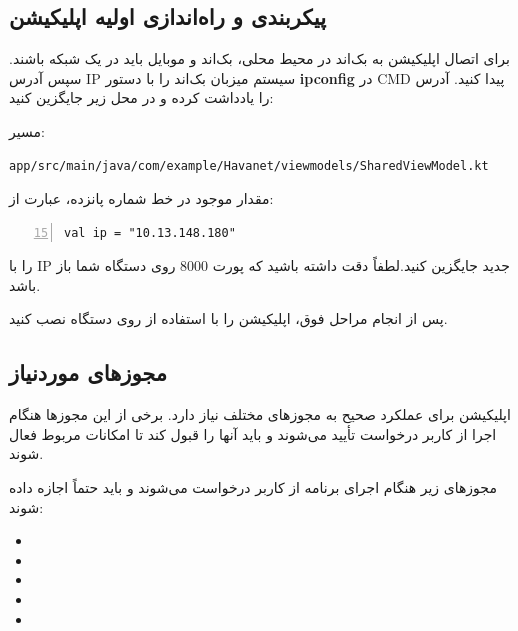 \documentclass{report}
\begin{document}
\chapter{ }

\section{پیکربندی و راه‌اندازی اولیه اپلیکیشن}

برای اتصال اپلیکیشن به بک‌اند در محیط محلی، بک‌اند و موبایل باید در یک شبکه باشند. سپس آدرس IP سیستم میزبان بک‌اند را با دستور \textbf{ipconfig} در CMD پیدا کنید. آدرس  را یادداشت کرده و در محل زیر جایگزین کنید:

	مسیر: \\
	\begin{latin}
		\texttt{app/src/main/java/com/example/Havanet/viewmodels/SharedViewModel.kt}\\
	\end{latin}
	مقدار موجود در خط شماره پانزده، عبارت از:
\begin{latin}
\begin{lstlisting}[mathescape=true, numbers=left, firstnumber=15]
val ip = "10.13.148.180"
\end{lstlisting}
\end{latin}
	را با IP جدید جایگزین کنید.لطفاً دقت داشته باشید که پورت 8000 روی دستگاه شما باز باشد.

	

\vspace{0.5cm}

پس از انجام مراحل فوق، اپلیکیشن را با استفاده از  روی دستگاه نصب کنید.

\section{مجوزهای موردنیاز}

اپلیکیشن برای عملکرد صحیح به مجوزهای مختلف نیاز دارد. برخی از این مجوزها هنگام اجرا از کاربر درخواست تأیید می‌شوند و باید آنها را قبول کند تا امکانات مربوط فعال شوند.

مجوزهای زیر هنگام اجرای برنامه از کاربر درخواست می‌شوند و باید حتماً اجازه داده شوند:

\begin{itemize}
	\item {}
	\item {}
	\item {}
	\item {}
	\item {}
\end{itemize}
\end{document}
